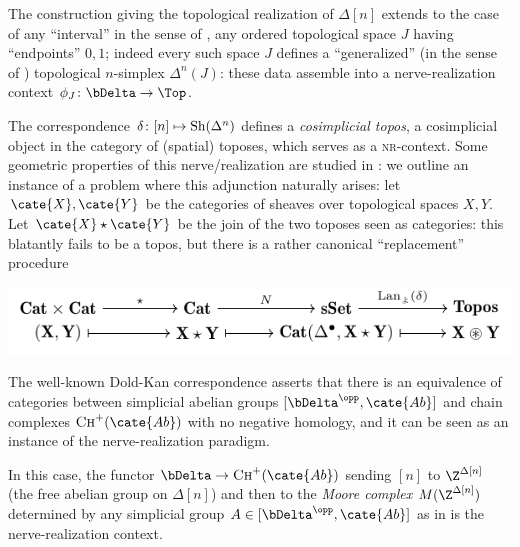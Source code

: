 \begin{example}\label{mordicchio}
The construction giving the topological realization of $\Delta[n]$ extends to the case of any ``interval'' in the sense of \cite[\S \textbf{III.1}]{Moe}, \ie any ordered topological space $J$ having ``endpoints'' $0,1$; indeed every such space $J$ defines a ``generalized'' (in the sense of \cite[\S \textbf{III.1}]{Moe}) topological $n$-simplex $\Delta^n{(J)}$: these data assemble into a nerve\hyp{}realization context $\phi_J\colon \bDelta\to \Top$.
\end{example} 
\begin{example}\label{toposophic}
The correspondence $\delta\colon [n]\mapsto {\rm Sh}(\Delta^n)$ defines a \emph{cosimplicial topos}, \ie a cosimplicial object in the category of (spatial) toposes, which serves as a \textsc{nr}-context. Some geometric properties of this nerve/realization are studied in \cite[\S \textbf{III}]{Moe}: we outline an instance of a problem where this adjunction naturally arises: let $\cate{X}, \cate{Y}$ be the categories of sheaves over topological spaces $X,Y$. Let $\cate{X}\star \cate{Y}$ be the join of the two toposes seen as categories: this blatantly fails to be a topos, but there is a rather canonical ``replacement'' procedure 
\begin{center}
\includegraphics[scale=1]{figures/fig1}
\end{center}
\end{example}
\begin{example} \label{doldekanne}
The well-known Dold-Kan correspondence \cite{dold1958homology} asserts that there is an equivalence of categories between simplicial abelian groups $[\bDelta^\opp,\cate{Ab}]$ and chain complexes $\textsc{Ch}^+(\cate{Ab})$ with no negative homology, and it can be seen as an instance of the nerve\hyp{}realization paradigm.

In this case, the functor $\bDelta\to \textsc{Ch}^+(\cate{Ab})$ sending $[n]$ to $\Z^{\Delta[n]}$ (the free abelian group on $\Delta[n]$) and then to the \emph{Moore complex} $M(\Z^{\Delta[n]})$ determined by any simplicial group $A\in [\bDelta^\opp,\cate{Ab}]$ as in \cite{GoJ} is the nerve\hyp{}realization context.
\end{example}
